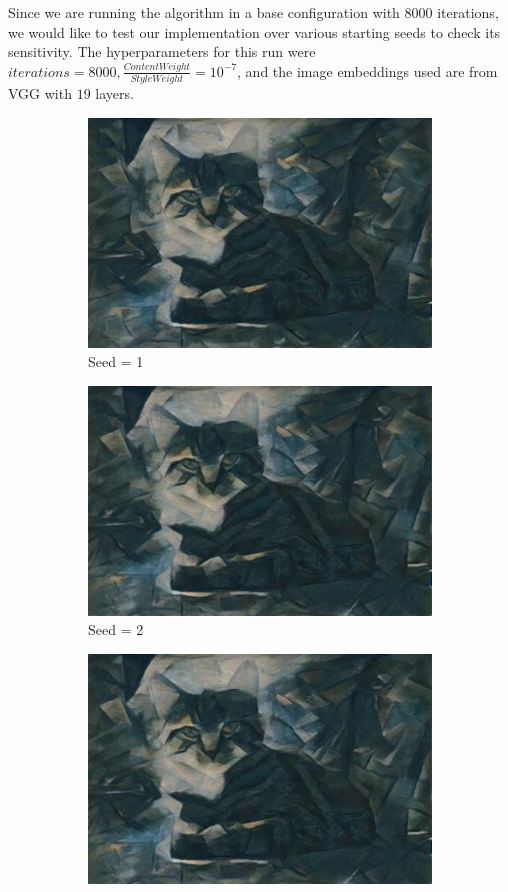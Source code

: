 \documentclass{article}
\begin{document}
Since we are running the algorithm in a base configuration with 8000 iterations, we would like to test our implementation over various starting seeds to check its sensitivity. The hyperparameters for this run were $iterations = 8000, \frac{Content Weight}{Style Weight} = 10^{-7}$, and the image embeddings used are from VGG with $19$ layers.

\begin{figure}[H]
\begin{subfigure}{.5\textwidth}
  \centering
  \includegraphics[width=.8\linewidth]{cat_dark_8000}
  \caption{Seed = 1}
  \label{fig:sfig1}
\end{subfigure}
\begin{subfigure}{.5\textwidth}
  \centering
  \includegraphics[width=.8\linewidth]{cat_dark2}
  \caption{Seed = 2}
  \label{fig:sfig2}
\end{subfigure}
\begin{subfigure}{.5\textwidth}
  \centering
  \includegraphics[width=.8\linewidth]{cat_dark3}

\end{subfigure}
\end{figure}
\end{document}

